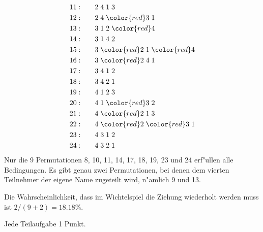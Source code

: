\begin{loesung}
\begin{teilaufgaben}
\begin{align*}
11:\qquad&            2 \;            4 \;            1 \;            3 \\
12:\qquad&            2 \;            4 \;{\color{red}3}\;            1 \\
%
13:\qquad&            3 \;            1 \;            2 \;{\color{red}4}\\
14:\qquad&            3 \;            1 \;            4 \;            2 \\
15:\qquad&            3 \;{\color{red}2}\;            1 \;{\color{red}4}\\
16:\qquad&            3 \;{\color{red}2}\;            4 \;            1 \\
17:\qquad&            3 \;            4 \;            1 \;            2 \\
18:\qquad&            3 \;            4 \;            2 \;            1 \\
%
19:\qquad&            4 \;            1 \;            2 \;            3 \\
20:\qquad&            4 \;            1 \;{\color{red}3}\;            2 \\
21:\qquad&            4 \;{\color{red}2}\;            1 \;            3 \\
22:\qquad&            4 \;{\color{red}2}\;{\color{red}3}\;            1 \\
23:\qquad&            4 \;            3 \;            1 \;            2 \\
24:\qquad&            4 \;            3 \;            2 \;            1
\end{align*}
Nur die 9 Permutationen 8, 10, 11, 14, 17, 18, 19, 23 und 24 erf"ullen
alle Bedingungen.
Es gibt genau zwei Permutationen, bei denen dem vierten Teilnehmer der
eigene Name zugeteilt wird, n"amlich 9 und 13.
\item
Die Wahrscheinlichkeit, dass im Wichtelspiel die Ziehung wiederholt 
werden muss ist $2/(9 + 2)=18.18\%$.
\end{teilaufgaben}
\end{loesung}

\begin{bewertung}
Jede Teilaufgabe 1 Punkt.
\end{bewertung}


